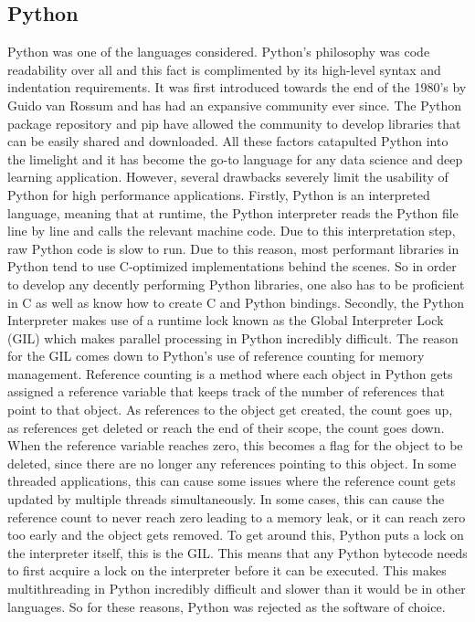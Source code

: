 \subsection{Python}
Python was one of the languages considered. Python's philosophy was code readability over all and this fact is
complimented by its high-level syntax and indentation requirements. It was first introduced towards the end of the
1980's by Guido van Rossum and has had an expansive community ever since. The Python package repository and pip have
allowed the community to develop libraries that can be easily shared and downloaded. All these factors catapulted Python
into the limelight and it has become the go-to language for any data science and deep learning application. However,
several drawbacks severely limit the usability of Python for high performance applications. Firstly, Python is an
interpreted language, meaning that at runtime, the Python interpreter reads the Python file line by line and calls the
relevant machine code. Due to this interpretation step, raw Python code is slow to run. Due to this reason, most
performant libraries in Python tend to use C-optimized implementations behind the scenes. So in order to develop any
decently performing Python libraries, one also has to be proficient in C as well as know how to create C and Python
bindings. Secondly, the Python Interpreter makes use of a runtime lock known as the Global Interpreter Lock (GIL) which
makes parallel processing in Python incredibly difficult. The reason for the GIL comes down to Python's use of reference
counting for memory management. Reference counting is a method where each object in Python gets assigned a reference
variable that keeps track of the number of references that point to that object. As references to the object get
created, the count goes up, as references get deleted or reach the end of their scope, the count goes down. When the
reference variable reaches zero, this becomes a flag for the object to be deleted, since there are no longer any
references pointing to this object. In some threaded applications, this can cause some issues where the reference count
gets updated by multiple threads simultaneously. In some cases, this can cause the reference count to never reach zero
leading to a memory leak, or it can reach zero too early and the object gets removed. To get around this, Python puts a
lock on the interpreter itself, this is the GIL. This means that any Python bytecode needs to first acquire a lock on
the interpreter before it can be executed. This makes multithreading in Python incredibly difficult and slower than it
would be in other languages. So for these reasons, Python was rejected as the software of choice.

